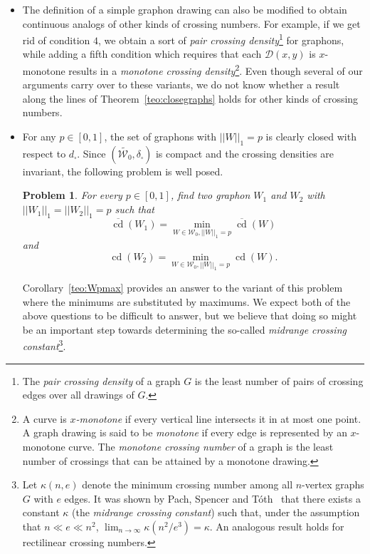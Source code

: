 \documentclass{article}
\newcounter{contSect} \numberwithin{contSect}{section}
\newtheorem{problem}[contSect]{Problem}
\begin{document}
\begin{itemize}
\item The definition of a simple graphon drawing can also be modified to obtain continuous analogs of other kinds of crossing numbers. For example, if we get rid of condition $4$, we obtain a sort of \textit{pair crossing density}\footnote{The \textit{pair crossing density} of a graph $G$ is the least number of pairs of crossing edges over all drawings of $G$.} for graphons, while adding a fifth condition which requires that each $\mathcal{D}(x,y)$ is $x$-monotone results in a \textit{monotone crossing density}\footnote{A curve is $x$\textit{-monotone} if every vertical line intersects it in at most one point. A graph drawing is said to be \textit{monotone} if every edge is represented by an $x$-monotone curve. The \textit{monotone crossing number} of a graph is the least number of crossings that can be attained by a monotone drawing.}. Even though several of our arguments carry over to these variants, we do not know whether a result along the lines of Theorem~\ref{teo:closegraphs} holds for other kinds of crossing numbers.

\item For any $p\in[0,1]$, the set of graphons with $||W||_1=p$ is clearly closed with respect to $d_\square$. Since $(\widetilde{\mathcal{W}_0},\delta_\square)$ is compact and the crossing densities are invariant, the following problem is well posed.

\begin{problem}
    For every $p\in[0,1]$, find two graphon $W_1$ and $W_2$ with $||W_1||_1=||W_2||_1=p$ such that \[\overline{\mathop{\mathrm{cd}}}(W_1)=\min_{W\in\mathcal{W}_0,||W||_1=p}\overline{\mathop{\mathrm{cd}}}(W)\] and \[\mathop{\mathrm{cd}}(W_2)=\min_{W\in\mathcal{W}_0,||W||_1=p}\mathop{\mathrm{cd}}(W).\]
\end{problem}

Corollary~\ref{teo:Wpmax} provides an answer to the variant of this problem where the minimums are substituted by maximums. We expect both of the above questions to be difficult to answer, but we believe that doing so might be an important step towards determining the so-called \textit{midrange crossing constant}\footnote{Let $\kappa(n,e)$ denote the minimum crossing number among all $n$-vertex graphs $G$ with $e$ edges. It was shown by Pach, Spencer and Tóth~\cite{pach1999new} that there exists a constant $\kappa$ (the \textit{midrange crossing constant}) such that, under the assumption that $n\ll e\ll n^2$, $\lim_{n\rightarrow \infty}\kappa(n^2/e^3)=\kappa$. An analogous result holds for rectilinear crossing numbers.}.  


\end{itemize}
\end{document}
